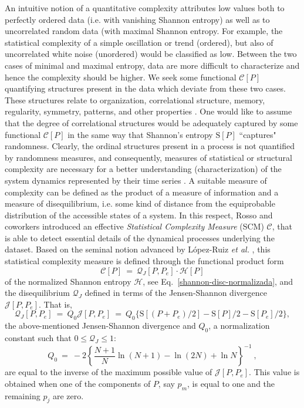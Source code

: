 An intuitive notion of a quantitative complexity attributes low values both to perfectly ordered data (i.e. with vanishing Shannon entropy) as well as to uncorrelated random data (with maximal Shannon entropy.
For example, the statistical complexity of a simple oscillation or trend (ordered), but also of uncorrelated white noise (unordered) would be classified as low.
Between the two cases of minimal and maximal entropy, data are more difficult to characterize and hence the complexity should be higher.
We seek some functional ${\mathcal C} [P]$ quantifying structures present in the data which deviate from these two cases.
These structures relate to organization, correlational structure, memory, regularity, symmetry, patterns, and other properties \cite{Feldman2008}.
One would like to assume that the degree of correlational structures would be adequately captured by some functional ${\mathcal C} [P]$ in the same way that Shannon's entropy ${\mathrm S}[P]$ \cite{Shannon1948} ``captures" randomness.
Clearly, the ordinal structures present in a process is not quantified by randomness measures, and consequently, measures of statistical or structural complexity are necessary for a better understanding (characterization) of the system dynamics represented by their time series \cite{Crutchfield1998}. 
A suitable measure of complexity can be defined as the product of a measure of information and a measure of
disequilibrium, i.e. some kind of distance from the equiprobable distribution of the accessible states of 
a system. 
In this respect, Rosso and coworkers \cite{Lamberti2004} introduced an effective {\it Statistical Complexity Measure\/} (SCM) ${\mathcal C}$, that is able to detect essential details of the dynamical processes underlying the dataset.
Based on the seminal notion advanced by L\'opez-Ruiz {\it et al.} \cite{LMC1995}, this statistical complexity measure\cite{Martin2003,Lamberti2004} is defined through the functional product form
\begin{equation}
{\mathcal C}[P] ~=~ {\mathcal Q}_{J}[P,P_e] \cdot {\mathcal H}[P]
\label{complexity}
\end{equation}
of the normalized Shannon entropy ${\mathcal H}$, see Eq.~\eqref{shannon-disc-normalizada}, and the disequilibrium ${\mathcal Q}_{J}$ defined in terms of the Jensen-Shannon divergence ${\mathcal J}[ P, P_e]$.
That is,
\begin{equation}
\label{disequilibrium}
{\mathcal Q}_{J} [ P, P_e] ~=~ Q_{0} {\mathcal J}[ P, P_e] ~=~ 
Q_{0} \{ {\mathrm S}[(P + P_e)/2 ] - {\mathrm S}[ P ]/2 - {\mathrm S}[P_e]/2\},
\end{equation}
the above-mentioned Jensen-Shannon divergence and $Q_0$, a normalization constant such that $0 \leq {\mathcal Q}_{J} \leq 1$:
\begin{equation}
Q_0 ~=~ -2 \left\{ {\frac{N+1}{N}} \ln (N+1) - \ln (2N) + \ln N \right\}^{-1} \ ,
\label{q0-jensen-1}
\end{equation}
are equal to the inverse of the maximum possible value of ${\mathcal J} [P,P_e]$.
This value is obtained when one of the components of $P$, say $p_m$, is equal to one and the remaining $p_j$ are zero.

